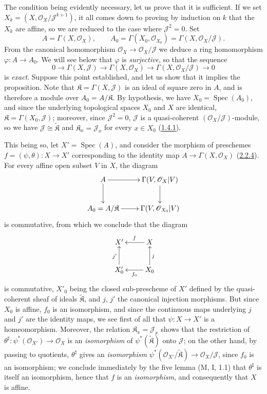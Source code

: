 The condition being evidently necessary, let us prove that it is sufficient.
If we set $X_k=(X,\mathscr{O}_X/\mathscr{J}^{k+1})$, it all comes down to
proving by induction on $k$ that the $X_k$ are affine, so we are reduced to
the case where $\mathscr{J}^2=0$. Set
\[
  A=\Gamma(X,\mathscr{O}_X),\qquad
  A_0=\Gamma(X_0,\mathscr{O}_{X_0})
      =\Gamma(X,\mathscr{O}_X/\mathscr{J}).
\]
From the canonical homomorphism
$\mathscr{O}_X\to\mathscr{O}_X/\mathscr{J}$ we deduce a ring homomorphism
$\varphi:A\to A_0$. We will see below that $\varphi$ is
\emph{surjective}, so that the sequence
\[
  0\to\Gamma(X,\mathscr{J})\to\Gamma(X,\mathscr{O}_X)
  \to\Gamma(X,\mathscr{O}_X/\mathscr{J})\to 0
  \tag{5.1.9.1}\label{I.5.1.9.1}
\]
is \emph{exact}. Suppose this point established, and let us show that it
implies the proposition. Note that $\mathfrak{K}=\Gamma(X,\mathscr{J})$ is an
ideal of square zero in $A$, and is therefore a module over
$A_0=A/\mathfrak{K}$. By hypothesis, we have $X_0=\operatorname{Spec}(A_0)$,
and since the underlying topological spaces $X_0$ and $X$ are identical,
$\mathfrak{K}=\Gamma(X_0,\mathscr{J})$; moreover, since
$\mathscr{J}^2=0$, $\mathscr{J}$ is a quasi-coherent
$(\mathscr{O}_X/\mathscr{J})$-module, so we have
$\mathscr{J}\cong\widetilde{\mathfrak{K}}$ and
$\mathfrak{K}_x=\mathscr{J}_x$ for every $x\in X_0$
(\hyperref[I.1.4.1]{1.4.1}).

This being so, let $X'=\operatorname{Spec}(A)$, and consider the morphism of
preschemes $f=(\psi,\theta):X\to X'$ corresponding to the identity map
$A\to\Gamma(X,\mathscr{O}_X)$
(\hyperref[I.2.2.4]{2.2.4}). For every affine open subset $V$ in $X$, the
diagram
\[
  \xymatrix{
    A\ar[r]\ar[d] & \Gamma(V,\mathscr{O}_X|V)\ar[d]\\
    A_0=A/\mathfrak{K}\ar[r] & \Gamma(V,\mathscr{O}_{X_0}|V)
  }
\]
is commutative, from which we conclude that the diagram
\[
  \xymatrix{
    X' & X\ar[l]_f\\
    X'_0\ar[u]^{j'} & X_0\ar[l]^{f_0}\ar[u]_j
  }
\]
is commutative, $X'_0$ being the closed sub-prescheme of $X'$ defined by the
quasi-coherent sheaf of ideals $\widetilde{\mathfrak{K}}$, and $j$, $j'$ the
canonical injection morphisms. But since $X_0$ is affine, $f_0$ is an
isomorphism, and since the continuous maps underlying $j$ and $j'$
are the identity maps, we see first of all that
$\psi:X\to X'$ is a homeomorphism. Moreover, the relation
$\mathfrak{K}_x=\mathscr{J}_x$ shows that the restriction of
$\theta^\sharp:\psi^*(\mathscr{O}_{X'})\to\mathscr{O}_X$ is an
\emph{isomorphism} of $\psi^*(\widetilde{\mathfrak{K}})$ onto $\mathscr{J}$;
on the other hand, by passing to quotients, $\theta^\sharp$ gives an
\emph{isomorphism}
$\psi^*(\mathscr{O}_{X'}/\widetilde{\mathfrak{K}})
\to\mathscr{O}_X/\mathscr{J}$, since $f_0$ is an isomorphism; we
conclude immediately by the five lemma (M, I, 1.1) that $\theta^\sharp$ is
itself an isomorphism, hence that $f$ is an \emph{isomorphism}, and
consequently that $X$ is affine.

